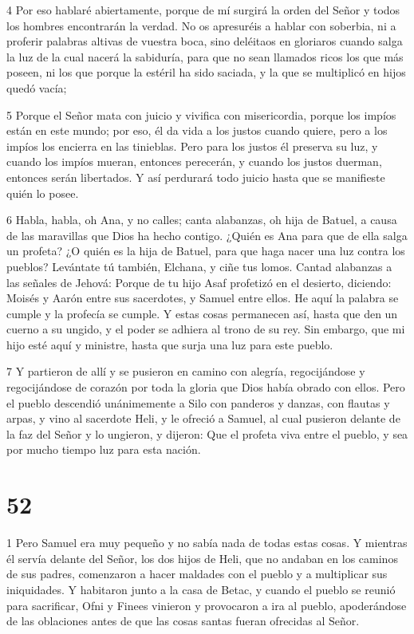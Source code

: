 \par 4 Por eso hablaré abiertamente, porque de mí surgirá la orden del Señor y todos los hombres encontrarán la verdad. No os apresuréis a hablar con soberbia, ni a proferir palabras altivas de vuestra boca, sino deléitaos en gloriaros cuando salga la luz de la cual nacerá la sabiduría, para que no sean llamados ricos los que más poseen, ni los que porque la estéril ha sido saciada, y la que se multiplicó en hijos quedó vacía;

\par 5 Porque el Señor mata con juicio y vivifica con misericordia, porque los impíos están en este mundo; por eso, él da vida a los justos cuando quiere, pero a los impíos los encierra en las tinieblas. Pero para los justos él preserva su luz, y cuando los impíos mueran, entonces perecerán, y cuando los justos duerman, entonces serán libertados. Y así perdurará todo juicio hasta que se manifieste quién lo posee.

\par 6 Habla, habla, oh Ana, y no calles; canta alabanzas, oh hija de Batuel, a causa de las maravillas que Dios ha hecho contigo. ¿Quién es Ana para que de ella salga un profeta? ¿O quién es la hija de Batuel, para que haga nacer una luz contra los pueblos? Levántate tú también, Elchana, y ciñe tus lomos. Cantad alabanzas a las señales de Jehová: Porque de tu hijo Asaf profetizó en el desierto, diciendo: Moisés y Aarón entre sus sacerdotes, y Samuel entre ellos. He aquí la palabra se cumple y la profecía se cumple. Y estas cosas permanecen así, hasta que den un cuerno a su ungido, y el poder se adhiera al trono de su rey. Sin embargo, que mi hijo esté aquí y ministre, hasta que surja una luz para este pueblo.

\par 7 Y partieron de allí y se pusieron en camino con alegría, regocijándose y regocijándose de corazón por toda la gloria que Dios había obrado con ellos. Pero el pueblo descendió unánimemente a Silo con panderos y danzas, con flautas y arpas, y vino al sacerdote Heli, y le ofreció a Samuel, al cual pusieron delante de la faz del Señor y lo ungieron, y dijeron: Que el profeta viva entre el pueblo, y sea por mucho tiempo luz para esta nación.

\chapter{52}

\par 1 Pero Samuel era muy pequeño y no sabía nada de todas estas cosas. Y mientras él servía delante del Señor, los dos hijos de Heli, que no andaban en los caminos de sus padres, comenzaron a hacer maldades con el pueblo y a multiplicar sus iniquidades. Y habitaron junto a la casa de Betac, y cuando el pueblo se reunió para sacrificar, Ofni y Finees vinieron y provocaron a ira al pueblo, apoderándose de las oblaciones antes de que las cosas santas fueran ofrecidas al Señor.

